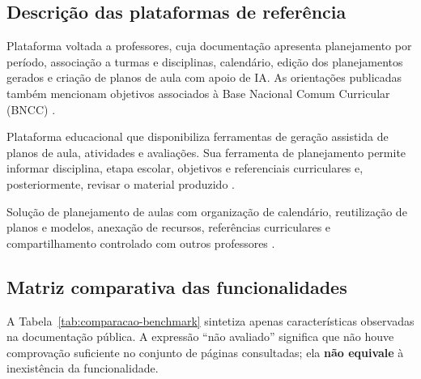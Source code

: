\subsection{Descrição das plataformas de referência}
\begin{description}[leftmargin=!,labelwidth=3cm]
  \item[Teachy.] Plataforma voltada a professores, cuja documentação apresenta planejamento por período, associação a turmas e disciplinas, calendário, edição dos planejamentos gerados e criação de planos de aula com apoio de IA. As orientações publicadas também mencionam objetivos associados à Base Nacional Comum Curricular (BNCC) \citep{teachy_planejamento2026,teachy_ferramentas2026}.
  \item[MagicSchool AI.] Plataforma educacional que disponibiliza ferramentas de geração assistida de planos de aula, atividades e avaliações. Sua ferramenta de planejamento permite informar disciplina, etapa escolar, objetivos e referenciais curriculares e, posteriormente, revisar o material produzido \citep{magicschool_planos2026,magicschool_ferramentas2026}.
  \item[Planbook.] Solução de planejamento de aulas com organização de calendário, reutilização de planos e modelos, anexação de recursos, referências curriculares e compartilhamento controlado com outros professores \citep{planbook_professores2026}.
\end{description}

\subsection{Matriz comparativa das funcionalidades}
A Tabela~\ref{tab:comparacao-benchmark} sintetiza apenas características observadas na documentação pública. A expressão ``não avaliado'' significa que não houve comprovação suficiente no conjunto de páginas consultadas; ela \textbf{não equivale} à inexistência da funcionalidade.

